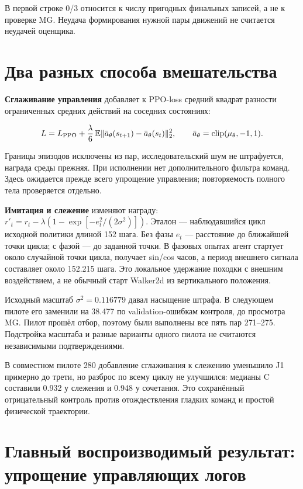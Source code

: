 \documentclass[10pt,a4paper]{article}
\begin{document}
В первой строке 0/3 относится к числу пригодных финальных записей, а не к проверке MG. Неудача формирования нужной пары движений не считается неудачей оценщика.

\section*{Два разных способа вмешательства}

\textbf{Сглаживание управления} добавляет к PPO-loss средний квадрат разности ограниченных средних действий на соседних состояниях:

\[
L=L_{\rm PPO}+\frac{\lambda}{6}\,\mathbb E\|\bar a_\theta(s_{t+1})-\bar a_\theta(s_t)\|_2^2,
\qquad \bar a_\theta=\operatorname{clip}(\mu_\theta,-1,1).
\]

Границы эпизодов исключены из пар, исследовательский шум не штрафуется, награда среды прежняя. При исполнении нет дополнительного фильтра команд. Здесь ожидается прежде всего упрощение управления; повторяемость полного тела проверяется отдельно.

\textbf{Имитация и слежение} изменяют награду: $r'_t=r_t-\lambda(1-\exp[-e_t^2/(2\sigma^2)])$. Эталон --- наблюдавшийся цикл исходной политики длиной 152 шага. Без фазы $e_t$ --- расстояние до ближайшей точки цикла; с фазой --- до заданной точки. В фазовых опытах агент стартует около случайной точки цикла, получает sin/cos часов, а период внешнего сигнала составляет около 152.215 шага. Это локальное удержание походки с внешним воздействием, а не обычный старт Walker2d из вертикального положения.

Исходный масштаб $\sigma^2=0.116779$ давал насыщение штрафа. В следующем пилоте его заменили на 38.477 по validation-ошибкам контроля, до просмотра MG. Пилот прошёл отбор, поэтому были выполнены все пять пар 271--275. Подстройка масштаба и разные варианты одного пилота не считаются независимыми подтверждениями.

В совместном пилоте 280 добавление сглаживания к слежению уменьшило J1 примерно до трети, но разброс по всему циклу не улучшился: медианы C составили 0.932 у слежения и 0.948 у сочетания. Это сохранённый отрицательный контроль против отождествления гладких команд и простой физической траектории.

\newpage

\section*{Главный воспроизводимый результат: упрощение управляющих логов}
\end{document}
